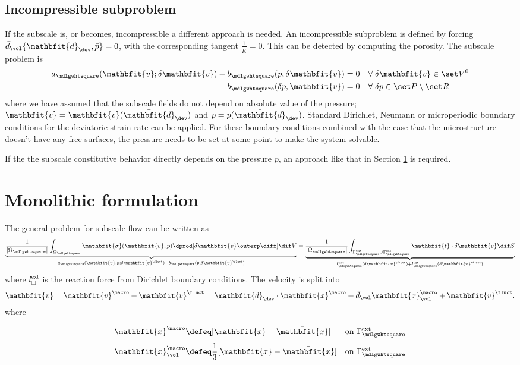 \documentclass[a4paper,11pt]{article}
\renewcommand{\ta}[1]{\mathbfit{#1}}
\renewcommand{\ts}[1]{\mathbfit{#1}}
\renewcommand{\Box}{\mdlgwhtsquare}
\newcommand{\internal}{\mathrm{int}}
\newcommand{\external}{\mathrm{ext}}
\begin{document}
\subsection{Incompressible subproblem} \label{sec:nested_incompressible}
If the subscale is, or becomes, incompressible a different approach is needed.
An incompressible subproblem is defined by forcing $\bar{d}_\vol\{\ts d_\dev,\bar{p}\} = 0$, with the corresponding tangent $\frac{1}{\bar{K}} = 0$.
This can be detected by computing the porosity.
The subscale problem is
\begin{align}
 a_\Box(\ta v; \delta\ta v) - b_\Box(p,\delta\ta v) &= 0\quad \forall\;\delta\ta v \in \set V^0 \\
 b_\Box(\delta p, \ta v) &= 0\quad \forall\;\delta p \in \set P\setminus\set R
\end{align}
where we have assumed that the subscale fields do not depend on absolute value of the pressure; $\ta v = \ta v(\bar{\ts d}_\dev)$ and $p = p(\bar{\ts d}_\dev)$.
Standard Dirichlet, Neumann  or microperiodic boundary conditions for the deviatoric strain rate can be applied.
For these boundary conditions combined with the case that the microstructure doesn't have any free surfaces, 
the pressure needs to be set at some point to make the system solvable.

If the the subscale constitutive behavior directly depends on the pressure $p$, an approach like that in Section \ref{sec:monolithic} is required.

\section{Monolithic formulation} \label{sec:monolithic}
The general problem for subscale flow can be written as
\begin{align}
 \underbrace{\frac{1}{|\Omega_\Box|} \int_{\Omega_\Box} \ts\sigma(\ta v, p)\dprod [\delta\ta v\outerp\diff] \dif V}_{a_\Box(\ta v,p;\delta\ta v^\fluct)-b_\Box(p,\delta\ta v^\fluct)}
	= \underbrace{\frac{1}{|\Omega_\Box|} \int_{\Gamma_\Box^\external \cup \Gamma_\Box^\internal} \ta t\cdot \delta\ta v\dif S}_{l_\Box^\external(\delta\ta v^\fluct)+l_\Box^\internal(\delta \ta v^\fluct)}
 \label{eq:subscale_original}
\end{align}
where $l_\Box^\external$ is the reaction force from Dirichlet boundary conditions.
The velocity is split into
\begin{align}
 \ta v = \ta v^\macro + \ta v^\fluct = \bar{\ts d}_\dev \cdot \ta x^\macro + \bar{d}_\vol \ta x_\vol^\macro + \ta v^\fluct.
\end{align}
where
\begin{align}
 \ta x^\macro \defeq& [\ta x - \bar{\ta x}]\phantom{\frac13} \quad\text{on } \Gamma_\Box^\external
 \label{eq:basefunction}
\\
\ta x_\vol^\macro \defeq & \frac13[\ta x - \bar{\ta x}] \quad\text{on } \Gamma_\Box^\external
 \label{eq:basefunction_vol}
\end{align}
 
\end{document}
